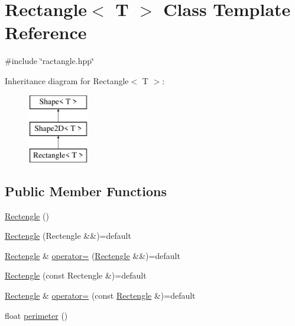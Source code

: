 \hypertarget{classRectangle}{}\section{Rectangle$<$ T $>$ Class Template Reference}
\label{classRectangle}


{\ttfamily \#include \char`\"{}ractangle.\+hpp\char`\"{}}

Inheritance diagram for Rectangle$<$ T $>$\+:\begin{figure}[H]
\begin{center}
\leavevmode
\includegraphics[height=3.000000cm]{classRectangle}
\end{center}
\end{figure}
\subsection*{Public Member Functions}
\begin{DoxyCompactItemize}
\item 
\mbox{\hyperlink{classRectangle_ac286ca610cf35b12f3fd1636312cb1ce}{Rectengle}} ()
\item 
\mbox{\hyperlink{classRectangle_aae13f4d97815a0226a06befa16719094}{Rectengle}} (Rectengle \&\&)=default
\item 
\mbox{\hyperlink{classRectangle_ac286ca610cf35b12f3fd1636312cb1ce}{Rectengle}} \& \mbox{\hyperlink{classRectangle_aa73d8d9047a77ee51854d578edffe9c3}{operator=}} (\mbox{\hyperlink{classRectangle_ac286ca610cf35b12f3fd1636312cb1ce}{Rectengle}} \&\&)=default
\item 
\mbox{\hyperlink{classRectangle_a5937069e17ab47587f0104a1ce2e493b}{Rectengle}} (const Rectengle \&)=default
\item 
\mbox{\hyperlink{classRectangle_ac286ca610cf35b12f3fd1636312cb1ce}{Rectengle}} \& \mbox{\hyperlink{classRectangle_a5d30fb9cc735b658d47707cf954a3827}{operator=}} (const \mbox{\hyperlink{classRectangle_ac286ca610cf35b12f3fd1636312cb1ce}{Rectengle}} \&)=default
\item 
float \mbox{\hyperlink{classRectangle_a22d415e8360e3bf565745b8bf4625cc5}{perimeter}} ()
\end{DoxyCompactItemize}
